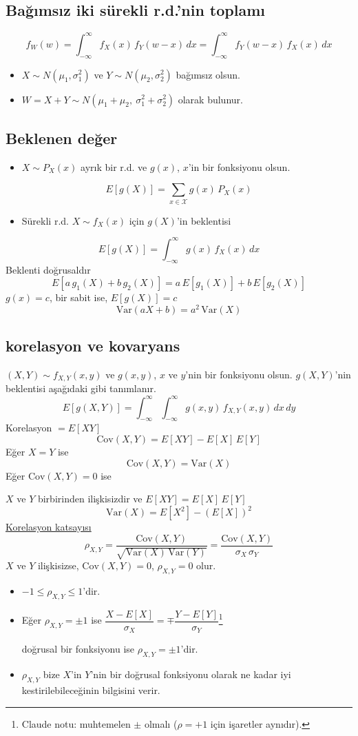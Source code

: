 \documentclass[11pt,a4paper]{article}
\begin{document}
\subsection{Bağımsız iki sürekli r.d.'nin toplamı}
\[ f_W(w)=\int_{-\infty}^{\infty}f_X(x)\,f_Y(w-x)\,dx=\int_{-\infty}^{\infty}f_Y(w-x)\,f_X(x)\,dx \]
\begin{itemize}
  \item $X\sim N(\mu_1,\sigma_1^2)$ ve $Y\sim N(\mu_2,\sigma_2^2)$ bağımsız olsun.
  \item $W=X+Y\sim N(\mu_1+\mu_2,\ \sigma_1^2+\sigma_2^2)$ olarak bulunur.
\end{itemize}

\subsection{Beklenen değer}
\begin{itemize}
  \item $X\sim P_X(x)$ ayrık bir r.d. ve $g(x)$, $x$'in bir fonksiyonu olsun.
\end{itemize}
\[ E[g(X)]=\sum_{x\in\mathcal{X}}g(x)\,P_X(x) \]
\begin{itemize}
  \item Sürekli r.d. $X\sim f_X(x)$ için $g(X)$'in beklentisi
\end{itemize}
\[ E[g(X)]=\int_{-\infty}^{\infty}g(x)\,f_X(x)\,dx \]
Beklenti doğrusaldır
\[ E[a\,g_1(X)+b\,g_2(X)]=a\,E[g_1(X)]+b\,E[g_2(X)] \]
$g(x)=c$, bir sabit ise, $E[g(X)]=c$
\[ \mathrm{Var}(aX+b)=a^2\,\mathrm{Var}(X) \]

\subsection{korelasyon ve kovaryans}
$(X,Y)\sim f_{X,Y}(x,y)$ ve $g(x,y)$, $x$ ve $y$'nin bir fonksiyonu olsun. $g(X,Y)$'nin beklentisi aşağıdaki gibi tanımlanır.
\[ E[g(X,Y)]=\int_{-\infty}^{\infty}\int_{-\infty}^{\infty}g(x,y)\,f_{X,Y}(x,y)\,dx\,dy \]
Korelasyon $=E[XY]$
\[ \mathrm{Cov}(X,Y)=E[XY]-E[X]\,E[Y] \]
Eğer $X=Y$ ise
\[ \mathrm{Cov}(X,Y)=\mathrm{Var}(X) \]
Eğer $\mathrm{Cov}(X,Y)=0$ ise

$X$ ve $Y$ birbirinden ilişkisizdir ve $E[XY]=E[X]\,E[Y]$
\[ \mathrm{Var}(X)=E[X^2]-(E[X])^2 \]
\vurgu[pembe]{$\star$} \underline{Korelasyon katsayısı}
\[ \rho_{X,Y}=\frac{\mathrm{Cov}(X,Y)}{\sqrt{\mathrm{Var}(X)\,\mathrm{Var}(Y)}}=\frac{\mathrm{Cov}(X,Y)}{\sigma_X\,\sigma_Y} \]
$X$ ve $Y$ ilişkisizse, $\mathrm{Cov}(X,Y)=0$, $\rho_{X,Y}=0$ olur.
\begin{itemize}
  \item $-1\le\rho_{X,Y}\le 1$'dir.
  \item Eğer $\rho_{X,Y}=\pm1$ ise $\dfrac{X-E[X]}{\sigma_X}=\mp\dfrac{Y-E[Y]}{\sigma_Y}$\footnote{Claude notu: muhtemelen $\pm$ olmalı ($\rho=+1$ için işaretler aynıdır).}

  doğrusal bir fonksiyonu ise $\rho_{X,Y}=\pm1$'dir.
  \item $\rho_{X,Y}$ bize $X$'in $Y$'nin bir doğrusal fonksiyonu olarak ne kadar iyi kestirilebileceğinin bilgisini verir.
\end{itemize}
\end{document}
